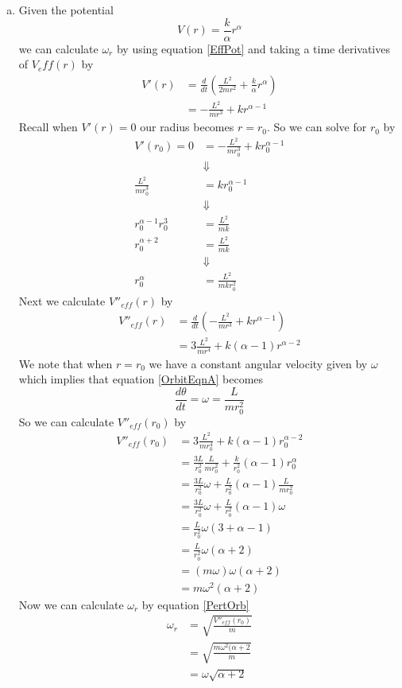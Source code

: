 \documentclass[11pt]{article}
\numberwithin{equation}{section}
\begin{document}
\begin{enumerate}[(a)]
\item Given the potential 
$$V(r) = \frac{k}{\alpha}r^{\alpha}$$
we can calculate $\omega_r$ by using equation \ref{EffPot} and taking a time derivatives 
of $V_eff(r)$ by
\begin{align*}
V'(r) &= \frac{d}{dt}\left(\frac{L^2}{2mr^2} + \frac{k}{\alpha}r^{\alpha}\right)\\
&= -\frac{L^2}{mr^3} + kr^{\alpha-1}
\end{align*}
Recall when $V'(r) = 0$ our radius becomes $r=r_0$. So we can solve for $r_0$ by
\begin{align*}
V'(r_0) = 0 &= -\frac{L^2}{mr_0^3} + kr_0^{\alpha-1}\\
&\Downarrow\\
\frac{L^2}{mr_0^3} &= kr_0^{\alpha-1}\\
&\Downarrow\\
r_0^{\alpha-1}r_0^3 &= \frac{L^2}{mk} \\
r_0^{\alpha+2} &= \frac{L^2}{mk} \\
&\Downarrow\\
r_0^{\alpha} &= \frac{L^2}{mkr_0^2} 
\end{align*}
Next we calculate $V''_{eff}(r)$ by
\begin{align*}
V''_{eff}(r) &= \frac{d}{dt}\left(-\frac{L^2}{mr^3} + kr^{\alpha-1}\right)\\
&= 3\frac{L^2}{mr^4} + k(\alpha-1)r^{\alpha-2}
\end{align*}
We note that when $r=r_0$ we have a constant angular velocity given by $\omega$ which implies
that equation \ref{OrbitEqnA} becomes
\begin{equation}
\frac{d\theta}{dt} = \omega = \frac{L}{mr_0^2}
\end{equation}
So we can calculate $V''_{eff}(r_0)$ by
\begin{align*}
V''_{eff}(r_0) &= 3\frac{L^2}{mr_0^4} + k(\alpha-1)r_0^{\alpha-2}\\
&= \frac{3L}{r_0^2}\frac{L}{mr_0^2} + \frac{k}{r_0^2}(\alpha-1)r_0^{\alpha}\\
&= \frac{3L}{r_0^2}\omega + \frac{L}{r_0^2}(\alpha-1)\frac{L}{mr_0^2}\\
&= \frac{3L}{r_0^2}\omega + \frac{L}{r_0^2}(\alpha-1)\omega\\
&= \frac{L}{r_0^2}\omega\left(3 + \alpha-1\right)\\
&= \frac{L}{r_0^2}\omega\left(\alpha+2\right)\\
&= (m\omega)\omega\left(\alpha+2\right)\\
&= m\omega^2\left(\alpha+2\right)
\end{align*}
Now we can calculate $\omega_r$ by equation \ref{PertOrb}
\begin{align*}
\omega_r &= \sqrt{\frac{V''_{eff}(r_0)}{m}}\\
&= \sqrt{\frac{m\omega^2(\alpha+2}{m}}\\
&= \omega\sqrt{\alpha+2}
\end{align*}


\end{enumerate}
\end{document}
